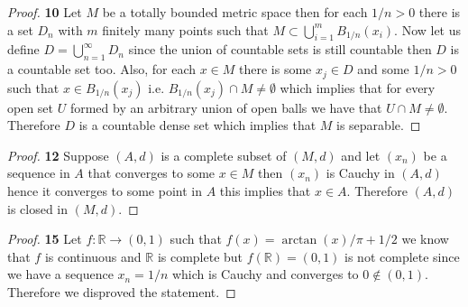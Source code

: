 \documentclass[11pt]{article}
\newcommand{\R}{\mathbb{R}}
\theoremstyle{definition}
\begin{document}
	\begin{proof}{\textbf{10}}
        Let $M$ be a totally bounded metric space then for each
        $1/n > 0$ there is a set $D_n$ with $m$ finitely many points such that
        $M \subset \bigcup_{i=1}^m B_{1/n}(x_i)$.
        Now let us define $D = \bigcup_{n=1}^\infty D_n$ since the union
        of countable sets is still countable then $D$ is a countable set too.
        Also, for each $x \in M$ there is some $x_j \in D$ and some $1/n >0$
        such that $x \in B_{1/n}(x_j)$ i.e. $B_{1/n}(x_j) \cap M \neq \emptyset$
        which implies that for every open set
        $U$ formed by an arbitrary union of open balls
        we have that $U \cap M \neq \emptyset$. Therefore $D$ is a countable
        dense set which implies that $M$ is separable.
    \end{proof}
	\begin{proof}{\textbf{12}}
        Suppose $(A,d)$ is a complete subset of $(M,d)$ and let $(x_n)$ be
        a sequence in $A$ that converges to some $x \in M$ then $(x_n)$ is
        Cauchy in $(A,d)$ hence it converges to some point in $A$ this implies
        that $x \in A$. Therefore $(A,d)$ is closed in $(M,d)$. 
    \end{proof}
	\begin{proof}{\textbf{15}}
        Let $f:\R \to (0,1)$ such that $f(x) = \arctan(x)/\pi + 1/2$ we know
        that $f$ is continuous and $\R$ is complete but $f(\R) = (0,1)$ is not
        complete since we have a sequence $x_n = 1/n$ which is Cauchy
        and converges to $0 \not\in (0,1)$. Therefore we disproved the statement.
    \end{proof}
\end{document}
